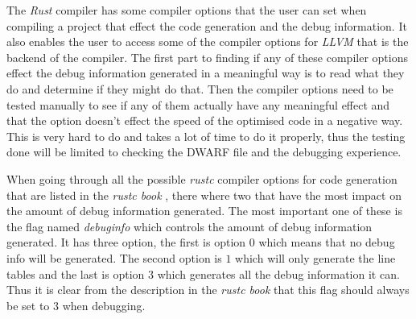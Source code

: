 
The \emph{Rust} compiler has some compiler options that the user can set when compiling a project that effect the code generation and the debug information.
It also enables the user to access some of the compiler options for \emph{LLVM} that is the backend of the compiler.
The first part to finding if any of these compiler options effect the debug information generated in a meaningful way is to read what they do and determine if they might do that.
Then the compiler options need to be tested manually to see if any of them actually have any meaningful effect and that the option doesn't effect the speed of the optimised code in a negative way.
This is very hard to do and takes a lot of time to do it properly, thus the testing done will be limited to checking the \gls{DWARF} file and the debugging experience.


When going through all the possible \emph{rustc} compiler options for code generation that are listed in the \emph{rustc book} \cite{rustc-book-codegen}, there where two that have the most impact on the amount of debug information generated.
The most important one of these is the flag named \emph{debuginfo} which controls the amount of debug information generated.
It has three option, the first is option $0$ which means that no debug info will be generated.
The second option is $1$ which will only generate the line tables and the last is option $3$ which generates all the debug information it can.
Thus it is clear from the description in the \emph{rustc book} that this flag should always be set to $3$ when debugging.


